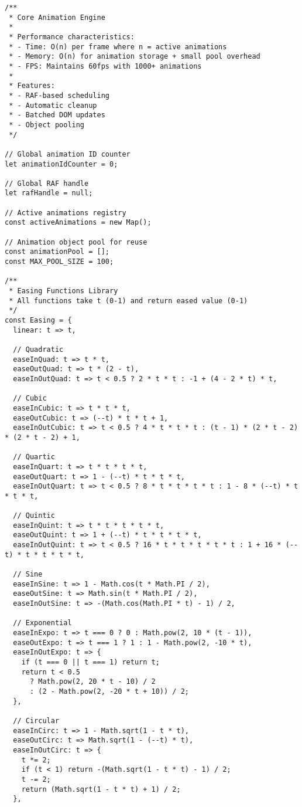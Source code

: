 \documentclass[11pt]{article}
\begin{document}
\begin{verbatim}
/**
 * Core Animation Engine
 * 
 * Performance characteristics:
 * - Time: O(n) per frame where n = active animations
 * - Memory: O(n) for animation storage + small pool overhead
 * - FPS: Maintains 60fps with 1000+ animations
 * 
 * Features:
 * - RAF-based scheduling
 * - Automatic cleanup
 * - Batched DOM updates
 * - Object pooling
 */

// Global animation ID counter
let animationIdCounter = 0;

// Global RAF handle
let rafHandle = null;

// Active animations registry
const activeAnimations = new Map();

// Animation object pool for reuse
const animationPool = [];
const MAX_POOL_SIZE = 100;

/**
 * Easing Functions Library
 * All functions take t (0-1) and return eased value (0-1)
 */
const Easing = {
  linear: t => t,
  
  // Quadratic
  easeInQuad: t => t * t,
  easeOutQuad: t => t * (2 - t),
  easeInOutQuad: t => t < 0.5 ? 2 * t * t : -1 + (4 - 2 * t) * t,
  
  // Cubic
  easeInCubic: t => t * t * t,
  easeOutCubic: t => (--t) * t * t + 1,
  easeInOutCubic: t => t < 0.5 ? 4 * t * t * t : (t - 1) * (2 * t - 2) * (2 * t - 2) + 1,
  
  // Quartic
  easeInQuart: t => t * t * t * t,
  easeOutQuart: t => 1 - (--t) * t * t * t,
  easeInOutQuart: t => t < 0.5 ? 8 * t * t * t * t : 1 - 8 * (--t) * t * t * t,
  
  // Quintic
  easeInQuint: t => t * t * t * t * t,
  easeOutQuint: t => 1 + (--t) * t * t * t * t,
  easeInOutQuint: t => t < 0.5 ? 16 * t * t * t * t * t : 1 + 16 * (--t) * t * t * t * t,
  
  // Sine
  easeInSine: t => 1 - Math.cos(t * Math.PI / 2),
  easeOutSine: t => Math.sin(t * Math.PI / 2),
  easeInOutSine: t => -(Math.cos(Math.PI * t) - 1) / 2,
  
  // Exponential
  easeInExpo: t => t === 0 ? 0 : Math.pow(2, 10 * (t - 1)),
  easeOutExpo: t => t === 1 ? 1 : 1 - Math.pow(2, -10 * t),
  easeInOutExpo: t => {
    if (t === 0 || t === 1) return t;
    return t < 0.5
      ? Math.pow(2, 20 * t - 10) / 2
      : (2 - Math.pow(2, -20 * t + 10)) / 2;
  },
  
  // Circular
  easeInCirc: t => 1 - Math.sqrt(1 - t * t),
  easeOutCirc: t => Math.sqrt(1 - (--t) * t),
  easeInOutCirc: t => {
    t *= 2;
    if (t < 1) return -(Math.sqrt(1 - t * t) - 1) / 2;
    t -= 2;
    return (Math.sqrt(1 - t * t) + 1) / 2;
  },
  

\end{verbatim}
\end{document}
